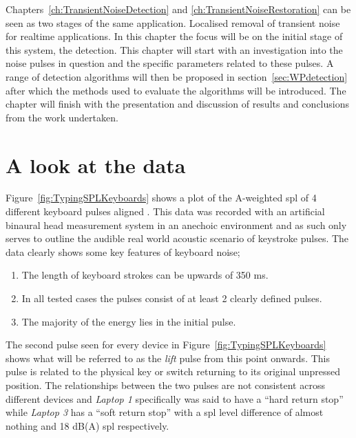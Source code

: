 Chapters~\ref{ch:TransientNoiseDetection} and \ref{ch:TransientNoiseRestoration} can be seen as two stages of the same application. Localised removal of transient noise for realtime applications. In this chapter the focus will be on the initial stage of this system, the detection. This chapter will start with an investigation into the noise pulses in question and the specific parameters related to these pulses. A range of detection algorithms will then be proposed in section~\ref{sec:WPdetection} after which the methods used to evaluate the algorithms will be introduced. The chapter will finish with the presentation and discussion of results and conclusions from the work undertaken.

\section{A look at the data}\label{sec:WPdata}
Figure~\ref{fig:TypingSPLKeyboards} shows a plot of the A-weighted \gls{spl} of 4 different keyboard pulses aligned \cite{Hauswirth2013}. This data was recorded with an artificial binaural head measurement system in an anechoic environment and as such only serves to outline the audible real world acoustic scenario of keystroke pulses. The data clearly shows some key features of keyboard noise;
\begin{enumerate}
\item The length of keyboard strokes can be upwards of 350 ms.
\item In all tested cases the pulses consist of at least 2 clearly defined pulses.
\item The majority of the energy lies in the initial pulse.
\end{enumerate}

The second pulse seen for every device in Figure~\ref{fig:TypingSPLKeyboards} shows what will be referred to as the \emph{lift} pulse from this point onwards. This pulse is related to the physical key or switch returning to its original unpressed position. The relationships between the two pulses are not consistent across different devices and \emph{Laptop 1} specifically was said to have a ``hard return stop'' while \emph{Laptop 3} has a ``soft return stop'' with a \gls{spl} level difference of almost nothing and 18 dB(A) \gls{spl} respectively.

